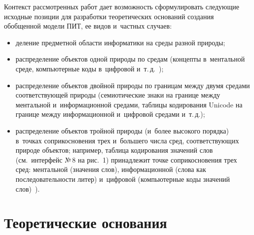 \begin{multicols}{2}
  Контекст рассмотренных работ дает возможность сформулировать 
следующие исходные позиции для разработки теоретических оснований 
созда\-ния обобщенной модели ПИТ, ее видов и~частных случаев:
  \begin{itemize}
  \item  деление предметной области информатики на среды разной 
природы;
  \item распределение объектов одной природы по средам (концепты 
в~ментальной среде, компьютерные коды в~цифровой и~т.\,д.~\cite{3-zac});
  \item  распределение объектов двойной природы по границам между двумя 
средами со\-от\-вет\-ст\-ву\-ющей природы (семиотические знаки на границе между 
ментальной и~информационной средами, таблицы кодирования Unicode на 
границе между информационной и~цифровой средами и~т.\,д.);
  \item распределение объектов тройной природы (и~более высокого 
порядка) в~точках соприкосновения трех и~большего числа 
сред, соответствующих природе объектов; например, таблица кодирования 
значений слов (см.\ интерфейс №\,8 на рис.~1) принадлежит точке 
соприкосновения трех сред: ментальной (значения слов), информационной 
(слова как последовательности литер) и~цифровой (компьютерные коды 
значений слов)~\cite{3-zac, 16-zac}).
  \end{itemize}
  
\section{Теоретические основания}


\end{multicols}
